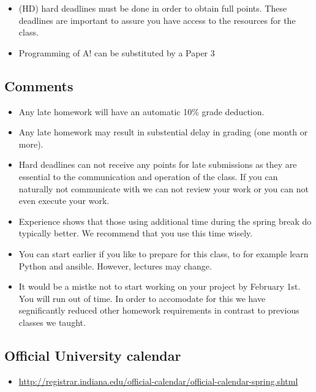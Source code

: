 \begin{itemize}
\item {} 
(HD) hard deadlines must be done in order to obtain full
points. These deadlines are important to assure you have access to
the resources for the class.

\item {} 
Programming of A! can be substituted by a Paper 3

\end{itemize}


\subsection{Comments}
\label{\detokenize{i524/calendar:comments}}\begin{itemize}
\item {} 
Any late homework will have an automatic 10\% grade deduction.

\item {} 
Any late homework may result in substential delay in grading (one month or
more).

\item {} 
Hard deadlines can not receive any points for late submissions as they are
essential to the communication and operation of the class. If you can naturally
not communicate with we can not review your work or you can not even
execute your work.

\item {} 
Experience shows that those using additional time during the spring break do
typically better. We recommend that you use this time wisely.

\item {} 
You can start earlier if you like to prepare for this class, to for example
learn Python and ansible. However, lectures may change.

\item {} 
It would be a mistke not to start working on your project by
February 1st. You will run out of time. In order to accomodate for
this we have segnificantly reduced other homework requirements in
contrast to previous classes we taught.

\end{itemize}


\subsection{Official University calendar}
\label{\detokenize{i524/calendar:official-university-calendar}}\begin{itemize}
\item {} 
\url{http://registrar.indiana.edu/official-calendar/official-calendar-spring.shtml}

\end{itemize}


